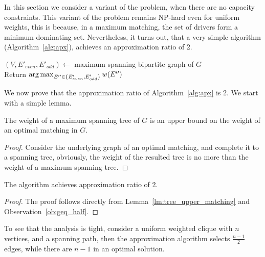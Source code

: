 \label{sub:ucudcm}
In this section we consider a variant of the problem, 
when there are no capacity constraints.
This variant of the problem remains NP-hard even for uniform weights,
this is because, in a maximum matching, the set of drivers form a minimum
dominating set. 
Nevertheless, it turns out, that a very simple algorithm
(Algorithm~\ref{alg:apx}), achieves an approximation ratio of 2.

\begin{algorithm}
\label{alg:apx}
\caption{\UCCARPOOL{}}
$(V, E'_{even}, E'_{odd}) \leftarrow$ maximum spanning bipartite graph of $G$		\\
Return $\operatorname*{arg\,max}_{E'' \in \{ E'_{even}, E'_{odd} \}}{w(E'')} $	\\
\end{algorithm}

We now prove that the approximation ratio of Algorithm~\ref{alg:apx} is 2.
We start with a simple lemma.

\begin{lemma}
\label{lm:tree_upper_matching}
The weight of a maximum spanning tree of $G$ is an upper bound on the weight of
an optimal matching in $G$.
\end{lemma}

\begin{proof}
Consider the underlying graph of an optimal matching, and complete it to a spanning tree, obviously, the
weight of the resulted tree is no more than the weight of a maximum spanning
tree.
\end{proof}

\begin{theorem}
The \UCCARPOOL{} algorithm achieves approximation ratio of 2.
\end{theorem}

\begin{proof}
The proof follows directly from 
Lemma~\ref{lm:tree_upper_matching} and Observation~\ref{ob:geq_half}.
\end{proof}

To see that the analysis is tight, 
consider a uniform weighted clique with $n$ vertices, 
and a spanning path, 
then the approximation algorithm selects $\frac{n - 1}{2}$ edges, 
while there are $n - 1$ in an optimal solution.  